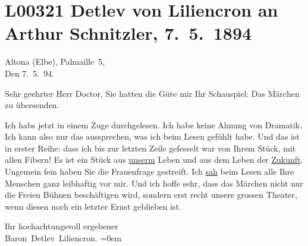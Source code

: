 

\section[Detlev von Liliencron an Arthur Schnitzler, 7. 5. 1894]{L00321 Detlev von Liliencron an Arthur Schnitzler, 7. 5. 1894}
\nopagebreak{}
\rehead{ }\normalsize\beginnumbering{}
\toendnotes[C]{\smallbreak\pagebreak[2]}
\toendnotes[C]{\smallbreak}
\pstart
           \raggedleft{}{\pb}Altona (Elbe), Palmaille 5,{\\}Den
                     7. 5. 94.\pend
           
\pstart{}Sehr geehrter Herr Doctor,\pend\vspace{0.5em}
\pstart
           Sie hatten die Güte mir Ihr Schauspiel: Das
                  Märchen zu übersenden.\pend
           
\pstart
           Ich habs jetzt in einem Zuge durchgelesen. Ich habe keine Ahnung von Dramatik. Ich
               kann also nur das aussprechen, was ich beim Lesen gefühlt habe. Und das ist in erster
               Reihe: dass ich bis zur letzten Zeile gefesselt war von Ihrem Stück, mit allen Fibern! Es ist ein Stück aus \uline{unserm} Leben und aus dem Leben der \uline{Zukunft}. Ungemein fein haben Sie die Frauenfrage gestreift. Ich \uline{sah} beim Lesen alle Ihre Menschen ganz leibhaftig vor
               mir. Und ich hoffe sehr, dass das Märchen nicht
               nur die Freien Bühnen beschäftigen wird, sondern erst recht unsere grossen Theater,
               wenn diesen noch ein letzter Ernst geblieben ist.\pend
           
\pstart
           Ihr hochachtungsvoll ergebener{\\[\baselineskip]}\spacefill\mbox{Baron Detlev Liliencron.}\pend
           \leftskip=0em{}\endnumbering{}  
      